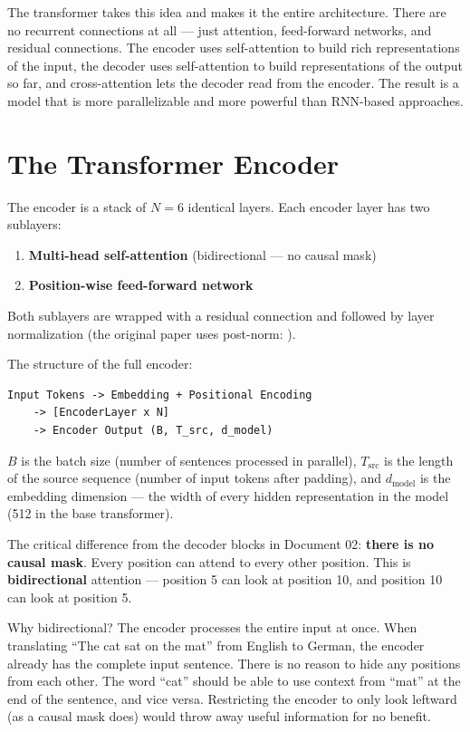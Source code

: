 The transformer takes this idea and makes it the entire architecture. There are no recurrent connections at all --- just attention, feed-forward networks, and residual connections. The encoder uses self-attention to build rich representations of the input, the decoder uses self-attention to build representations of the output so far, and cross-attention lets the decoder read from the encoder. The result is a model that is more parallelizable and more powerful than RNN-based approaches.

\section{The Transformer Encoder}

The encoder is a stack of $N = 6$ identical layers. Each encoder layer has two sublayers:

\begin{enumerate}
  \item \textbf{Multi-head self-attention} (bidirectional --- no causal mask)
  \item \textbf{Position-wise feed-forward network}
\end{enumerate}

Both sublayers are wrapped with a residual connection and followed by layer normalization (the original paper uses post-norm: ).

The structure of the full encoder:

\begin{verbatim}
Input Tokens -> Embedding + Positional Encoding
    -> [EncoderLayer x N]
    -> Encoder Output (B, T_src, d_model)
\end{verbatim}

$B$ is the batch size (number of sentences processed in parallel), $T_{\text{src}}$ is the length of the source sequence (number of input tokens after padding), and $d_{\text{model}}$ is the embedding dimension --- the width of every hidden representation in the model (512 in the base transformer).

The critical difference from the decoder blocks in Document 02: \textbf{there is no causal mask}. Every position can attend to every other position. This is \textbf{bidirectional} attention --- position 5 can look at position 10, and position 10 can look at position 5.

Why bidirectional? The encoder processes the entire input at once. When translating ``The cat sat on the mat'' from English to German, the encoder already has the complete input sentence. There is no reason to hide any positions from each other. The word ``cat'' should be able to use context from ``mat'' at the end of the sentence, and vice versa. Restricting the encoder to only look leftward (as a causal mask does) would throw away useful information for no benefit.

